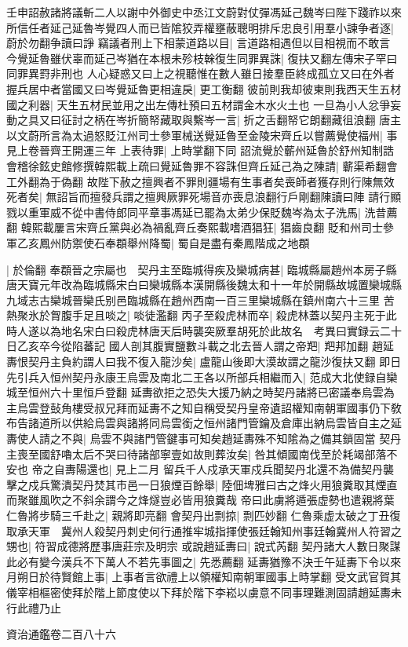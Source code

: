 壬申詔赦諸將議斬二人以謝中外御史中丞江文蔚對仗彈馮延己魏岑曰陛下踐祚以來所信任者延己延魯岑覺四人而已皆隂狡弄權壅蔽聰明排斥忠良引用羣小諫争者逐|{
	蔚於勿翻争讀曰諍}
竊議者刑上下相蒙道路以目|{
	言道路相遇但以目相視而不敢言}
今覺延魯雖伏辜而延己岑猶在本根未殄枝榦復生同罪異誅|{
	復扶又翻左傳宋子罕曰同罪異罸非刑也}
人心疑惑又曰上之視聽惟在數人雖日接羣臣終成孤立又曰在外者握兵居中者當國又曰岑覺延魯更相違戾|{
	更工衡翻}
彼前則我却彼東則我西天生五材國之利器|{
	天生五材民並用之出左傳杜預曰五材謂金木水火土也}
一旦為小人忿爭妄動之具又曰征討之柄在岑折簡帑藏取與繫岑一言|{
	折之舌翻帑它朗翻藏徂浪翻}
唐主以文蔚所言為太過怒貶江州司士參軍械送覺延魯至金陵宋齊丘以嘗薦覺使福州|{
	事見上卷晉齊王開運三年}
上表待罪|{
	上時掌翻下同}
詔流覺於蘄州延魯於舒州知制誥會稽徐鉉史館修撰韓熙載上疏曰覺延魯罪不容誅但齊丘延己為之陳請|{
	蘄渠希翻會工外翻為于偽翻}
故陛下赦之擅興者不罪則疆場有生事者矣喪師者獲存則行陳無效死者矣|{
	無詔旨而擅發兵謂之擅興厥罪死場音亦喪息浪翻行戶剛翻陳讀曰陣}
請行顯戮以重軍威不從中書侍郎同平章事馮延已罷為太弟少保貶魏岑為太子洗馬|{
	洗昔薦翻}
韓熙載屢言宋齊丘黨與必為禍亂齊丘奏熙載嗜酒猖狂|{
	猖齒良翻}
貶和州司士參軍乙亥鳳州防禦使石奉頵舉州降蜀|{
	蜀自是盡有秦鳳階成之地頵}


|{
	於倫翻}
奉頵晉之宗屬也　契丹主至臨城得疾及欒城病甚|{
	臨城縣屬趙州本房子縣唐天寶元年改為臨城縣宋白曰欒城縣本漢開縣後魏太和十一年於開縣故城置欒城縣九域志古欒城晉欒氏别邑臨城縣在趙州西南一百三里欒城縣在鎮州南六十三里}
苦熱聚氷於胷腹手足且啖之|{
	啖徒濫翻}
丙子至殺虎林而卒|{
	殺虎林蓋以契丹主死于此時人遂以為地名宋白曰殺虎林唐天后時襲突厥羣胡死於此故名　考異曰實録云二十日乙亥卒今從陷蕃記}
國人剖其腹實鹽數斗載之北去晉人謂之帝羓|{
	羓邦加翻}
趙延夀恨契丹主負約謂人曰我不復入龍沙矣|{
	盧龍山後即大漠故謂之龍沙復扶又翻}
即日先引兵入恒州契丹永康王烏雲及南北二王各以所部兵相繼而入|{
	范成大北使録自欒城至恒州六十里恒戶登翻}
延夀欲拒之恐失大援乃納之時契丹諸將已密議奉烏雲為主烏雲登鼔角樓受叔兄拜而延夀不之知自稱受契丹皇帝遺詔權知南朝軍國事仍下敎布告諸道所以供給烏雲與諸將同烏雲銜之恒州諸門管鑰及倉庫出納烏雲皆自主之延夀使人請之不與|{
	烏雲不與諸門管鍵事可知矣趙延夀殊不知隂為之備其鎖固當}
契丹主喪至國舒嚕太后不哭曰待諸部寧壹如故則葬汝矣|{
	咎其傾國南伐至於耗竭部落不安也}
帝之自夀陽還也|{
	見上二月}
留兵千人戍承天軍戍兵聞契丹北還不為備契丹襲擊之戍兵驚潰契丹焚其市邑一日狼煙百餘舉|{
	陸佃埤雅曰古之烽火用狼糞取其煙直而聚雖風吹之不斜余謂今之烽燧豈必皆用狼糞哉}
帝曰此虜將遁張虚勢也遣親將葉仁魯將步騎三千赴之|{
	親將即亮翻}
會契丹出剽掠|{
	剽匹妙翻}
仁魯乘虚太破之丁丑復取承天軍　冀州人殺契丹刺史何行通推牢城指揮使張廷翰知州事廷翰冀州人符習之甥也|{
	符習成德將歷事唐莊宗及明宗}
或說趙延夀曰|{
	說式芮翻}
契丹諸大人數日聚謀此必有變今漢兵不下萬人不若先事圖之|{
	先悉薦翻}
延夀猶豫不決壬午延夀下令以來月朔日於待賢館上事|{
	上事者言欲禮上以領權知南朝軍國事上時掌翻}
受文武官賀其儀宰相樞密使拜於階上節度使以下拜於階下李崧以虜意不同事理難測固請趙延夀未行此禮乃止

資治通鑑卷二百八十六
